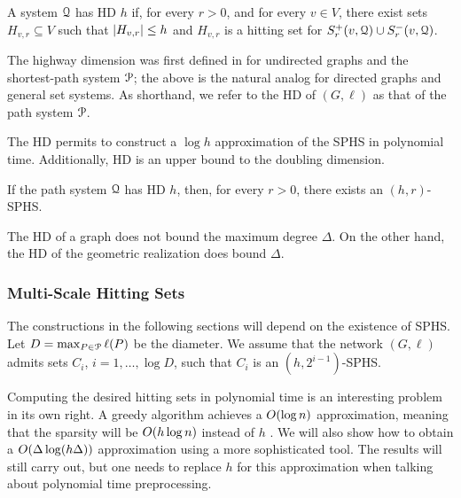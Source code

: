 \begin{definition}
A system $\mathcal{Q}$ has HD $h$ if, for every $r>0$, and for every $v\in V$, there exist sets $H_{v,r}\subseteq V$ such that $\lvert H_{v,r}\rvert\leq h$ and $H_{v,r}$ is a hitting set for $S_r^+(v,\mathcal{Q})\cup S_r^-(v,\mathcal{Q})$.
\end{definition}

The highway dimension was first defined in \citet{highway2013} for undirected graphs and the shortest-path system $\mathcal{P}$; the above is the natural analog for directed graphs and general set systems. As shorthand, we refer to the HD of $(G,\ell)$ as that of the path system $\mathcal{P}$.


The HD permits to construct a $\log h$ approximation of the SPHS in polynomial time.
Additionally, HD is an upper bound to the doubling dimension.


\begin{proposition}
If the path system $\mathcal{Q}$ has HD $h$, then, for every $r>0$, there exists an $(h,r)$-SPHS.
\end{proposition}

The HD of a graph does not bound the maximum degree $\Delta$.
On the other hand, the HD of the geometric realization does bound $\Delta$.


\subsubsection{Multi-Scale Hitting Sets} \label{sec:multi_scale}
The constructions in the following sections will depend on the existence of SPHS.
Let $D=\max_{P\in\mathcal{P}}\ell(P)$ be the diameter.
We assume that the network $(G,\ell)$ admits sets $C_i$, $i=1,\ldots,\log D$, such that $C_i$ is an $(h,2^{i-1})$-SPHS.

Computing the desired hitting sets in polynomial time is an interesting problem in its own right.
A greedy algorithm achieves a $O(\log n)$ approximation, meaning that the sparsity will be $O(h\log n)$ instead of $h$ .
We will also show how to obtain a $O(\Delta\log(h\Delta))$ approximation using a more sophisticated tool.
The results will still carry out, but one needs to replace $h$ for this approximation when talking about polynomial time preprocessing.

